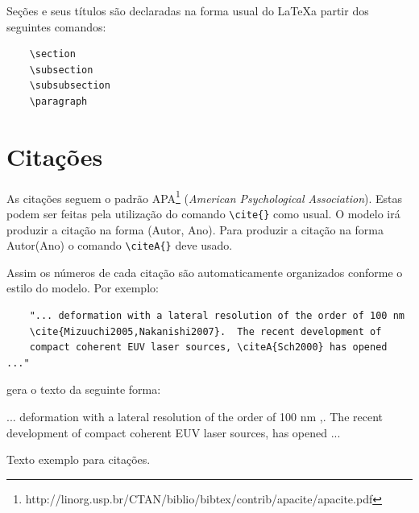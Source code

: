 \documentclass[12pt,A4,A4pt]{article}
\begin{document}
{\hspace{0.5cm}Seções e seus títulos são declaradas na forma usual do \LaTeX a partir dos seguintes comandos:

\begin{verbatim}
    \section
    \subsection
    \subsubsection
    \paragraph
\end{verbatim}

\section{Citações}
\hspace{0.5cm}As citações seguem o padrão APA\footnote{http://linorg.usp.br/CTAN/biblio/bibtex/contrib/apacite/apacite.pdf} (\textit{American Psychological Association}). Estas podem ser feitas pela utilização do comando \verb|\cite{}| como usual. O modelo irá produzir a citação na forma (Autor, Ano). Para produzir a citação na forma Autor(Ano) o comando  \verb|\citeA{}| deve usado.

Assim os números de cada citação são automaticamente organizados conforme o estilo do modelo. Por exemplo:

\begin{verbatim}
    "... deformation with a lateral resolution of the order of 100 nm
    \cite{Mizuuchi2005,Nakanishi2007}.  The recent development of 
    compact coherent EUV laser sources, \citeA{Sch2000} has opened ..."
\end{verbatim}
gera o texto da seguinte forma:

... deformation with a lateral resolution of the order of 100 nm \cite{Nakanishi2007},\break \cite{Mizuuchi2002}. The recent development of compact coherent EUV laser sources,  has opened ...

Texto exemplo para citações.

}
\end{document}
